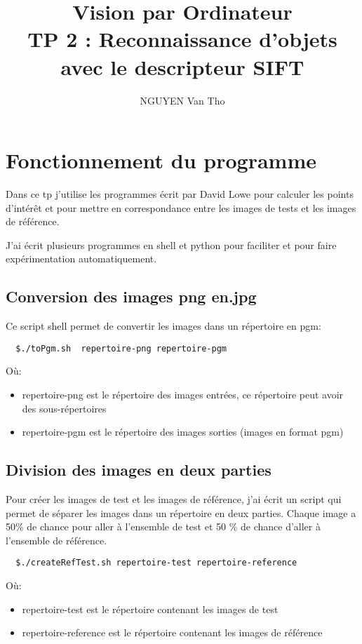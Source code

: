 \documentclass[french,12pt,a4paper,oneside,notitlepage]{report}
\makeatletter
\renewcommand\paragraph{\@startsection{paragraph}{4}{\z@}%
  {-3.25ex\@plus -1ex \@minus -.2ex}%
  {1.5ex \@plus .2ex}%
  {\normalfont\normalsize\bfseries}}
\newcommand\yourName{NGUYEN Van Tho}
\newcommand\yourTitle{\Huge Vision par Ordinateur\\ \Large TP 2 : Reconnaissance d'objets 
avec le descripteur SIFT
}
\makeatother
\begin{document}
\author{\yourName}
\title{\yourTitle}
\maketitle
\section{Fonctionnement du programme}
Dans ce tp j'utilise les programmes écrit par David Lowe pour calculer les points 
d'intérêt et pour mettre en correspondance entre les images de tests et les images de 
référence.

J'ai écrit plusieurs programmes en shell et python pour faciliter et pour faire 
expérimentation automatiquement.
\subsection{Conversion des images png en.jpg}
Ce script shell permet de convertir les images dans un répertoire en pgm:
\begin{lstlisting}
  $./toPgm.sh  repertoire-png repertoire-pgm
\end{lstlisting}
Où:
\begin{itemize}
 \item repertoire-png est le répertoire des images entrées, ce répertoire peut avoir des 
sous-répertoires
 \item repertoire-pgm est le répertoire des images sorties (images en format pgm)
\end{itemize}

\subsection{Division des images en deux parties}
  Pour créer les images de test et les images de référence, j'ai écrit un script qui 
permet de séparer les images dans un répertoire en deux parties. Chaque image a 50\% de 
chance pour aller à l'ensemble de test et 50 \% de chance d'aller à l'ensemble de 
référence.

\begin{lstlisting}
  $./createRefTest.sh repertoire-test repertoire-reference
\end{lstlisting}
Où:
\begin{itemize}
 \item repertoire-test est le répertoire contenant les images de test 
 \item repertoire-reference est le répertoire contenant les images de référence
\end{itemize}
\end{document}
